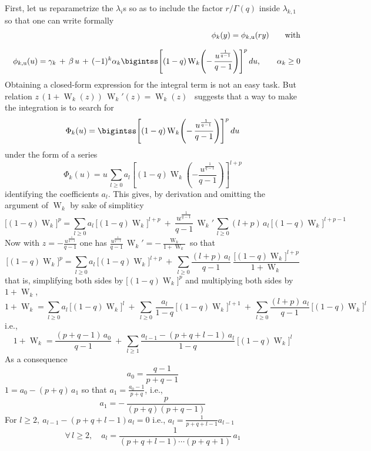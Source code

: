 \documentclass[entropy,article,submit,moreauthors,pdftex]{Definitions/mdpi}
\def\W{\operatorname{W}} %
\def\u{\mathrm{u}}
\begin{document}
First,  let us  reparametrize  the  $\lambda_i$s so  as  to  include the  factor
$r/\Gamma(q)$ inside $\lambda_{k,1}$ so that one can write formally
%
\begin{eqnarray}
&&\phi_k(y) = \phi_{k,\u}(r y)  \qquad \mbox{with}
\\[2.5mm]
&& \phi_{k,\u}(u) = \gamma_k \, + \, \beta \, u \, + \, (-1)^k \alpha_k
\bigintss \left[ (1-q) \W_k\left( - \, \frac{u^{\frac{1}{q-1}}}{q-1} \right)
  \right]^p \, du, \qquad \alpha_k \ge 0 \nonumber
\end{eqnarray}
%
Obtaining a  closed-form expression for the  integral term is not  an easy task.
But relation  $z \, (1+\W_k(z)) \,  \W_k'(z) = \W_k(z)$~\cite[Eq.~3.2]{CorGon96}
suggests that a way to make the integration is to search for
%
\begin{equation}
\Phi_k(u) =  \bigintss \left[ (1-q) \W_k\left(  - \, \frac{u^{\frac{1}{q-1}}}{q-1}
  \right) \right]^p \, du
\end{equation}
%
under the form of a series
%
\[
\Phi_k(u)   =   u   \,   \sum_{l   \ge  0}   a_l   \left[   (1-q)   \W_k\left(   -
  \frac{u^{\frac{1}{q-1}}}{q-1} \right) \right]^{l+p}
\]
%
identifying the coefficients  $a_l$. This gives, by derivation  and omitting the
argument of $\W_k$ by sake of simpliticy
%
\[
\Big[ (1-q) \W_k \Big]^p = \sum_{l \ge 0} a_l \, \Big[ (1-q) \W_k \Big]^{l+p} \:
+ \:  \frac{u^{\frac{1}{q-1}}}{q-1} \, \W_k' \,  \sum_{l \ge 0} (l+p)  \, a_l \,
\Big[ (1-q) \W_k \Big]^{l+p-1}
\]
%
Now      with     $z      =     -\frac{u^{\frac{1}{q-1}}}{q-1}$      one     has
$\frac{u^{\frac{1}{q-1}}}{q-1} \, \W_k' = - \frac{\W_k}{1+\W_k}$ so that
%
\[
\Big[ (1-q) \W_k \Big]^p = \sum_{l \ge 0} a_l \, \Big[ (1-q) \W_k \Big]^{l+p} \:
+  \:  \sum_{l  \ge  0}  \frac{(l+p) \,  a_l}{q-1}  \:  \frac{\Big[  (1-q)  \W_k
    \Big]^{l+p}}{1+\W_k}
\]
%
that is, simplifying  both sides by $\Big[ (1-q) \W_k  \Big]^p $ and multiplying
both sides by $1 + \W_k$,
%
\[
1 + \W_k = \sum_{l \ge 0} a_l \, \Big[ (1-q) \W_k \Big]^l \: + \: \sum_{l \ge
  0} \, \frac{a_l}{1-q}  \, \Big[ (1-q) \W_k \Big]^{l+1} \:  + \: \sum_{l \ge
  0} \frac{(l+p) \, a_l}{q-1} \, \Big[ (1-q) \W_k \Big]^l
\]
%
i.e.,
%
\[
1 + \W_k = \frac{(p+q-1) \, a_0}{q-1} \: +  \: \sum_{l \ge 1} \frac{a_{l-1} - (p + q + l -
  1) \, a_l}{1-q} \: \Big[ (1-q) \W_k \Big]^l
\]
%
As a consequence
%
\[
a_0 = \frac{q-1}{p+q-1}
\]
%
$1 = a_0 - (p + q) \, a_1$ so that $a_1 = \frac{a_0-1}{p+q}$, i.e.,
\[
a_1 = - \, \frac{p}{(p+q) (p+q-1)}
\]
%
For $l \ge 2, \: a_{l-1} - (p+q+l-1) a_l = 0$ i.e., $a_l = \frac{1}{p+q+l-1} a_{l-1}$
%
\[
\forall \, l \ge 2, \quad a_l = \frac{1}{(p+q+l-1) \cdots (p+q+1)} \, a_1
\]
\end{document}
